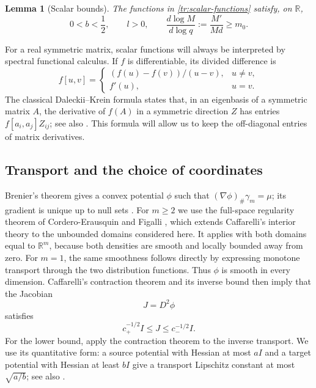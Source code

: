 \documentclass[11pt]{article}
\newcommand{\R}{\mathbb R}
\newtheorem{lemma}[theorem]{Lemma}
\theoremstyle{definition}
\theoremstyle{remark}
\numberwithin{equation}{section}
\begin{document}
\begin{lemma}[Scalar bounds]\label{tr:scalar-basic}
The functions in \eqref{tr:scalar-functions} satisfy, on $\mathbb R$,
\begin{equation}\label{tr:scalar-basic-equations}
 0<b<\frac12,\qquad l>0,\qquad
 \frac{d\log M}{d\log q}
 :=\frac{M'}{Md}\ge m_0.
\end{equation}
\end{lemma}

For a real symmetric matrix, scalar functions will always be interpreted
by spectral functional calculus.  If $f$ is differentiable, its divided
difference is
\begin{equation}\label{tr:divided-difference}
 f[u,v]=\begin{cases}(f(u)-f(v))/(u-v),&u\ne v,\\f'(u),&u=v.
 \end{cases}
\end{equation}
The classical Daleckii--Krein formula
\cite{DaleckiiKrein1965} states that, in an eigenbasis of a symmetric
matrix $A$, the derivative of $f(A)$ in a symmetric direction $Z$ has
entries $f[a_i,a_j]Z_{ij}$; see also
\cite[Section~2.4]{Noferini2017}.  This formula
will allow us to keep the off-diagonal entries of matrix derivatives.

\subsection{Transport and the choice of coordinates}

Brenier's theorem gives a convex potential $\phi$ such that
$(\nabla\phi)_\#\gamma_m=\mu$; its gradient is unique up to null sets
\cite{Brenier1991,McCann1995}.  For $m\ge2$ we use the full-space
regularity theorem of Cordero-Erausquin and Figalli
\cite[Theorem~1.1]{CorderoErausquinFigalli2019}, which extends
Caffarelli's interior theory \cite{Caffarelli1992} to the unbounded
domains considered here.  It applies with both domains equal to $\R^m$, because both densities
are smooth and locally bounded away from zero.  For $m=1$, the same
smoothness follows directly by expressing monotone transport through
the two distribution functions.  Thus $\phi$ is smooth in every dimension.
Caffarelli's contraction theorem \cite{Caffarelli2000} and its inverse
bound then imply that the Jacobian
\begin{equation}\label{tr:Jacobian}
 J=D^2\phi
\end{equation}
satisfies
\begin{equation}\label{tr:Jacobian-bounds}
 c_+^{-1/2}I\le J\le c_-^{-1/2}I.
\end{equation}
For the lower bound, apply the contraction theorem to the inverse
transport.  We use its quantitative form: a source potential with
Hessian at most $aI$ and a target potential with Hessian at least $bI$
give a transport Lipschitz constant at most $\sqrt{a/b}$; see also
\cite[Theorem~1]{ChewiPooladian2023}.
\end{document}
